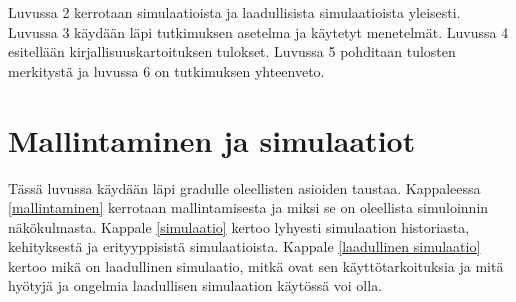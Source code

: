 \documentclass[utf8]{gradu3}
\begin{document}
Luvussa 2 kerrotaan simulaatioista ja laadullisista simulaatioista yleisesti. Luvussa 3 käydään läpi tutkimuksen asetelma ja käytetyt menetelmät. Luvussa 4 esitellään kirjallisuuskartoituksen tulokset. Luvussa 5 pohditaan tulosten merkitystä ja luvussa 6 on tutkimuksen yhteenveto.

\chapter{Mallintaminen ja simulaatiot}
\begin{comment}
Teksti on nyt aika lakonista luettelemista. Tätä kannattaa laventaa enemmän esseen tyyliseksi. Numeroidut osat ovat lukuja ja niiden alalukuja, jotka sitten jakutuvat numeroimattomiksi kappaleiksi. Englannin chapter ei ole kappale vaan kappale on paragraph.

Konkreettisena ohjeena, välltäisin 1 virkkeen kaltaista suoraan osoittavaa lausetta. Tyylillisesti voisi aloittaa vaikka tähän tapaan: Sumulaatiot perustuvat aina malleihin. Mallien muodostamista kuttsutaan mallintamiseksi. Alaluvussa 2.1 avataan mallintamisen prosessia ja sen roolia osana simulointiin perustuvaa tutkimusta.....

Ts vähän selitystä ja täytesanoja ja sitä kautta monimuotoisempaa tekstiä.
\end{comment}
Tässä luvussa käydään läpi gradulle oleellisten asioiden taustaa. 
Kappaleessa \ref{mallintaminen} kerrotaan mallintamisesta 
ja miksi se on oleellista simuloinnin näkökulmasta. 
Kappale \ref{simulaatio} kertoo lyhyesti simulaation historiasta, kehityksestä ja erityyppisistä simulaatioista. 
Kappale \ref{laadullinen simulaatio} kertoo mikä on laadullinen simulaatio, mitkä ovat sen käyttötarkoituksia ja mitä hyötyjä ja ongelmia laadullisen
simulaation käytössä voi olla.
\end{document}
